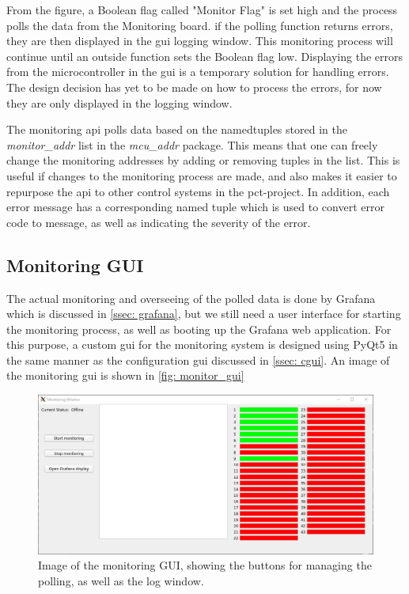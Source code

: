 \documentclass[main.tex]{subfiles}
\begin{document}
From the figure, a Boolean flag called "Monitor Flag" is set high and the process polls the data from the Monitoring board. if the polling function returns errors, they are then displayed in the \gls{gui} logging window. This monitoring process will continue until an outside function sets the Boolean flag low. Displaying the errors from the microcontroller in the \gls{gui} is a temporary solution for handling errors. The design decision has yet to be made on how to process the errors, for now they are only displayed in the logging window.


The monitoring \gls{api} polls data based on the namedtuples stored in the \textit{monitor\_addr} list in the \textit{mcu\_addr} package. This means that one can freely change the monitoring addresses by adding or removing tuples in the list. This is useful if changes to the monitoring process are made, and also makes it easier to repurpose the \gls{api} to other control systems in the \gls{pct}-project. In addition, each error message has a corresponding named tuple which is used to convert error code to message, as well as indicating the severity of the error.


\subsection{Monitoring GUI}

The actual monitoring and overseeing of the polled data is done by Grafana which is discussed in \autoref{ssec: grafana}, but we still need a user interface for starting the monitoring process, as well as booting up the Grafana web application. For this purpose, a custom \gls{gui} for the monitoring system is designed using PyQt5 in the same manner as the configuration \gls{gui} discussed in \autoref{ssec: cgui}. An image of the monitoring \gls{gui} is shown in \autoref{fig: monitor_gui}

\begin{figure}[!ht]
    \centering
    \includegraphics[scale=0.6]{images/monitoring_gui.png}
    \caption{Image of the monitoring GUI, showing the buttons for managing the polling, as well as the log window.}
    \label{fig: monitor_gui}
\end{figure}
\FloatBarrier
\end{document}
